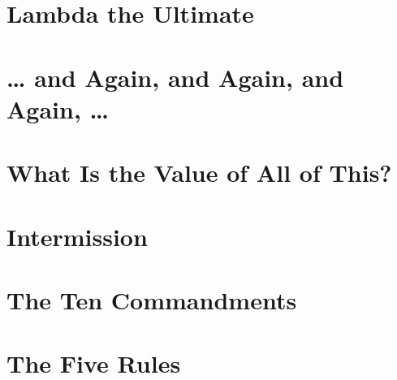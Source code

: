 \documentclass[11pt]{article}
\begin{document}
\newpage

\section{Lambda the Ultimate}
\label{sec:org5a53fb9}

\newpage

\section{\ldots{} and Again, and Again, and Again, \ldots{}}
\label{sec:org11675f4}

\newpage

\section{What Is the Value of All of This?}
\label{sec:orgf1c9020}

\newpage

\section{Intermission}
\label{sec:orgc598a40}

\newpage

\section{The Ten Commandments}
\label{sec:org353b1be}

\newpage

\section{The Five Rules}
\label{sec:orgc91a135}

\newpage
\end{document}
